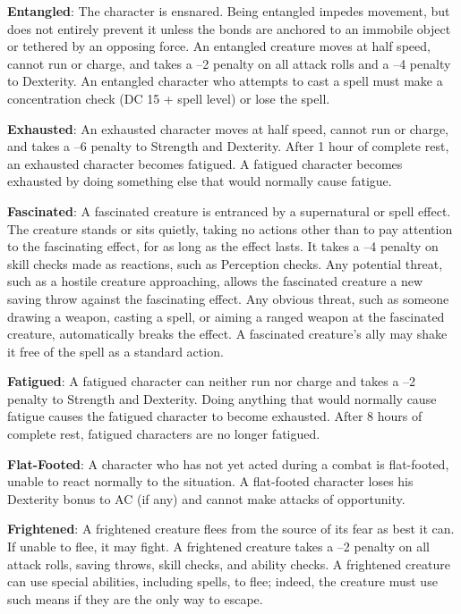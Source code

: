 \textbf{Entangled}: The character is ensnared. Being entangled impedes movement, but does not entirely prevent it unless the bonds are anchored to an immobile object or tethered by an opposing force. An entangled creature moves at half speed, cannot run or charge, and takes a --2 penalty on all attack rolls and a --4 penalty to Dexterity. An entangled character who attempts to cast a spell must make a concentration check (DC 15 + spell level) or lose the spell. 
				
\textbf{Exhausted}: An exhausted character moves at half speed, cannot run or charge, and takes a --6 penalty to Strength and Dexterity. After 1 hour of complete rest, an exhausted character becomes fatigued. A fatigued character becomes exhausted by doing something else that would normally cause fatigue.
				
\textbf{Fascinated}: A fascinated creature is entranced by a supernatural or spell effect. The creature stands or sits quietly, taking no actions other than to pay attention to the fascinating effect, for as long as the effect lasts. It takes a --4 penalty on skill checks made as reactions, such as Perception checks. Any potential threat, such as a hostile creature approaching, allows the fascinated creature a new saving throw against the fascinating effect. Any obvious threat, such as someone drawing a weapon, casting a spell, or aiming a ranged weapon at the fascinated creature, automatically breaks the effect. A fascinated creature's ally may shake it free of the spell as a standard action. 
				
\textbf{Fatigued}: A fatigued character can neither run nor charge and takes a --2 penalty to Strength and Dexterity. Doing anything that would normally cause fatigue causes the fatigued character to become exhausted. After 8 hours of complete rest, fatigued characters are no longer fatigued. 
				
\textbf{Flat-Footed}: A character who has not yet acted during a combat is flat-footed, unable to react normally to the situation. A flat-footed character loses his Dexterity bonus to AC (if any) and cannot make attacks of opportunity. 
				
\textbf{Frightened}: A frightened creature flees from the source of its fear as best it can. If unable to flee, it may fight. A frightened creature takes a --2 penalty on all attack rolls, saving throws, skill checks, and ability checks. A frightened creature can use special abilities, including spells, to flee; indeed, the creature must use such means if they are the only way to escape. 
				
